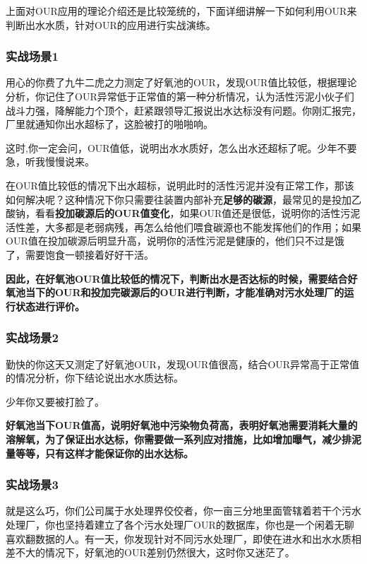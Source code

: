 \documentclass[]{book}
\begin{document}
上面对OUR应用的理论介绍还是比较笼统的，下面详细讲解一下如何利用OUR来判断出水水质，针对OUR的应用进行实战演练。

\subsubsection{实战场景1}\label{1}

用心的你费了九牛二虎之力测定了好氧池的OUR，发现OUR值比较低，根据理论分析，你记住了OUR异常低于正常值的第一种分析情况，认为活性污泥小伙子们战斗力强，降解能力个顶个，赶紧跟领导汇报说出水达标没有问题。你刚汇报完，厂里就通知你出水超标了，这脸被打的啪啪响。

这时,你一定会问，OUR值低，说明出水水质好，怎么出水还超标了呢。少年不要急，听我慢慢说来。

在OUR值比较低的情况下出水超标，说明此时的活性污泥并没有正常工作，那该如何解决呢？这种情况下你只需要往装置内部补充\textbf{足够的碳源}，最常见的是投加乙酸钠，看看\textbf{投加碳源后的OUR值变化}，如果OUR值还是很低，说明你的活性污泥活性差，大多都是老弱病残，再怎么给他们喂食碳源也不能发挥他们的作用；如果OUR值在投加碳源后明显升高，说明你的活性污泥是健康的，他们只不过是饿了，需要饱食一顿接着好好干活。

\textbf{因此，在好氧池OUR值比较低的情况下，判断出水是否达标的时候，需要结合好氧池当下的OUR和投加完碳源后的OUR进行判断，才能准确对污水处理厂的运行状态进行评价。}

\subsubsection{实战场景2}\label{2}

勤快的你这天又测定了好氧池OUR，发现OUR值很高，结合OUR异常高于正常值的情况分析，你下结论说出水水质达标。

少年你又要被打脸了。

\textbf{好氧池当下OUR值高，说明好氧池中污染物负荷高，表明好氧池需要消耗大量的溶解氧，为了保证出水达标，你需要做一系列应对措施，比如增加曝气，减少排泥量等等，只有这样才能保证你的出水达标。}

\subsubsection{实战场景3}\label{3}

就是这么巧，你们公司属于水处理界佼佼者，你一亩三分地里面管辖着若干个污水处理厂，你也坚持着建立了各个污水处理厂OUR的数据库，你也是一个闲着无聊喜欢翻数据的人。有一天，你发现针对不同污水处理厂，即使在进水和出水水质相差不大的情况下，好氧池的OUR差别仍然很大，这时你又迷茫了。
\end{document}
